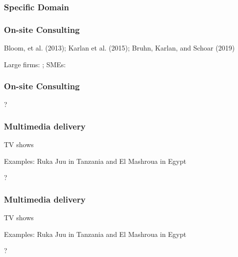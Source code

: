\documentclass[hideothersubsections, usenames,dvipsnames,11pt]{beamer}
\newenvironment{itemize_3pt}{\itemize\addtolength{\itemsep}{3pt}}{\enditemize}
\begin{document}
\begin{frame}
\frametitle{Specific Domain}
	\begin{itemize_3pt}
	\item \citep{Anderson2018}
	\vspace{0.1in}
	\end{itemize_3pt}
\end{frame}


\begin{frame}
\frametitle{On-site Consulting}
	\begin{itemize_3pt}
	\item Bloom, et al. (2013); Karlan et al. (2015); Bruhn, Karlan, and Schoar (2019)
	\item Large firms: \citep{Bloom2013}; SMEs: \citep{Bruhn2018}
	\item \citep{Karlan2015} \citep{Bruhn2019}
	\vspace{0.1in}
	\end{itemize_3pt}
\end{frame}

\begin{frame}
\frametitle{On-site Consulting}
	\begin{itemize_3pt}
	\item ?
	\vspace{0.1in}
	\end{itemize_3pt}
\end{frame}


\begin{frame}
\frametitle{Multimedia delivery}
	TV shows
	\begin{itemize_3pt}
	\item Examples: Ruka Juu in Tanzania \citep{Bjorvatn2020} and El Mashroua in Egypt \citep{Barsoum2018}
	\item ?
	\vspace{0.1in}
	\end{itemize_3pt}
\end{frame}

\begin{frame}
\frametitle{Multimedia delivery}
	TV shows
	\begin{itemize_3pt}
	\item Examples: Ruka Juu in Tanzania \citep{Bjorvatn2020} and El Mashroua in Egypt \citep{Barsoum2018}
	\item ?
	\vspace{0.1in}
	\end{itemize_3pt}
\end{frame}
\end{document}
